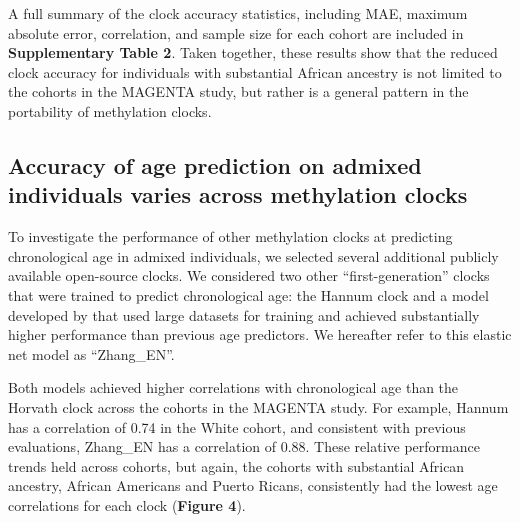 

A full summary of the clock accuracy statistics, including MAE, maximum absolute error, correlation, and sample size for each cohort are included in \textbf{Supplementary Table 2}. Taken together, these results show that the reduced clock accuracy for individuals with substantial African ancestry is not limited to the cohorts in the MAGENTA study, but rather is a general pattern in the portability of methylation clocks.


\subsection{Accuracy of age prediction on admixed individuals varies across methylation clocks}
To investigate the performance of other methylation clocks at predicting chronological age in admixed individuals, we selected several additional publicly available open-source clocks. We considered two other ``first-generation'' clocks that were trained to predict chronological age: the Hannum clock \citep{hannum_genome-wide_2013} and a model developed by \citealp{zhang_improved_2019} that used large datasets for training and achieved substantially higher performance than previous age predictors. We hereafter refer to this elastic net model as ``Zhang\_EN''.

Both models achieved higher correlations with chronological age than the Horvath clock across the cohorts in the MAGENTA study. For example, Hannum has a correlation of 0.74 in the White cohort, and consistent with previous evaluations, Zhang\_EN has a correlation of 0.88. These relative performance trends held across cohorts, but again, the cohorts with substantial African ancestry,  African Americans and Puerto Ricans, consistently had the lowest age correlations for each clock (\textbf{Figure 4}). 

